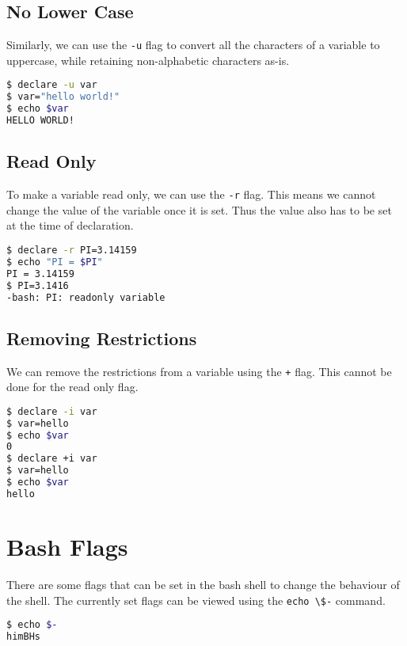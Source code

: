 \subsection{No Lower Case}

Similarly, we can use the \lstinline{-u} flag to convert all the characters of a variable to uppercase, while retaining non-alphabetic characters as-is.

\begin{lstlisting}[language=bash]
$ declare -u var
$ var="hello world!"
$ echo $var
HELLO WORLD!
\end{lstlisting}

\subsection{Read Only}

To make a variable read only, we can use the \lstinline{-r} flag.
This means we cannot change the value of the variable once it is set.
Thus the value also has to be set at the time of declaration.

\begin{lstlisting}[language=bash]
$ declare -r PI=3.14159
$ echo "PI = $PI"
PI = 3.14159
$ PI=3.1416
-bash: PI: readonly variable
\end{lstlisting}

\subsection{Removing Restrictions}

We can remove the restrictions from a variable using the \lstinline{+} flag.
This cannot be done for the read only flag.

\begin{lstlisting}[language=bash]
$ declare -i var
$ var=hello
$ echo $var
0
$ declare +i var
$ var=hello
$ echo $var
hello
\end{lstlisting}

\section{Bash Flags}

There are some flags that can be set in the bash shell to change the behaviour of the shell.
The currently set flags can be viewed using the \lstinline{echo \$-} command.

\begin{lstlisting}[language=bash]
$ echo $-
himBHs
\end{lstlisting}

